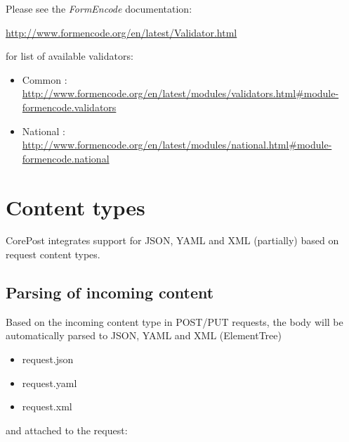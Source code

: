 \documentclass[letterpaper,10pt,english]{sphinxmanual}
\begin{document}
Please see the \emph{FormEncode} documentation:

\href{http://www.formencode.org/en/latest/Validator.html}{http://www.formencode.org/en/latest/Validator.html}

for list of available validators:
\begin{itemize}
\item {} 
Common : \href{http://www.formencode.org/en/latest/modules/validators.html\#module-formencode.validators}{http://www.formencode.org/en/latest/modules/validators.html\#module-formencode.validators}

\item {} 
National : \href{http://www.formencode.org/en/latest/modules/national.html\#module-formencode.national}{http://www.formencode.org/en/latest/modules/national.html\#module-formencode.national}

\end{itemize}


\section{Content types}
\label{content_types::doc}\label{content_types:content-types}
CorePost integrates support for JSON, YAML and XML (partially) based on request content types.


\subsection{Parsing of incoming content}
\label{content_types:parsing-of-incoming-content}
Based on the incoming content type in POST/PUT requests,
the body will be automatically parsed to JSON, YAML and XML (ElementTree)
\begin{itemize}
\item {} 
request.json

\item {} 
request.yaml

\item {} 
request.xml

\end{itemize}

and attached to the request:
\end{document}

